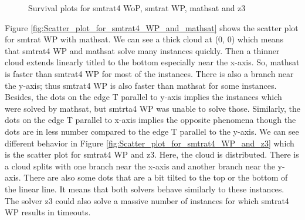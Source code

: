 \begin{figure}[!ht]
\caption{Survival plots for smtrat4 WoP, smtrat WP, mathsat and z3} 
\label{fig:Survival_plots_smtrat4} 
\end{figure}

\noindent Figure \ref{fig:Scatter_plot_for_smtrat4_WP_and_mathsat} shows the scatter plot for smtrat WP with mathsat.
We can see a thick cloud at (0, 0) which means that smtrat4 WP and mathsat solve many instances quickly.
Then a thinner cloud extends linearly titled to the bottom especially near the x-axis.
So, mathsat is faster than smtrat4 WP for most of the instances.
There is also a branch near the y-axis; thus smtrat4 WP is also faster than mathsat for some instances.
Besides, the dots on the edge T parallel to y-axis implies the instances which were solved by mathsat, but smtrta4 WP was unable to solve those.
Similarly, the dots on the edge T parallel to x-axis implies the opposite phenomena though the dots are in less number compared to the edge T parallel to the y-axis.
We can see different behavior in Figure \ref{fig:Scatter_plot_for_smtrat4_WP_and_z3} which is the scatter plot for smtrat4 WP and z3.
Here, the cloud is distributed.
There is a cloud splits with one branch near the x-axis and another branch near the y-axis.
There are also some dots that are a bit tilted to the top or the bottom of the linear line.
It means that both solvers behave similarly to these instances.
The solver z3 could also solve a massive number of instances for which smtrat4 WP results in timeouts.
\newline

